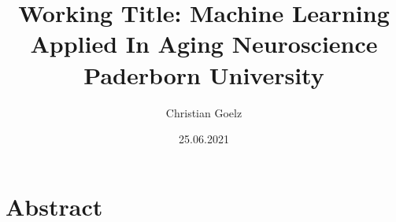 \documentclass[12pt]{report}
\title{
    {Working Title: Machine Learning Applied In Aging Neuroscience}\\
    {\large Paderborn University}\\
}
\author{Christian Goelz}
\date{25.06.2021}
\begin{document}
    \maketitle

    \chapter*{Abstract}
    
\end{document}
